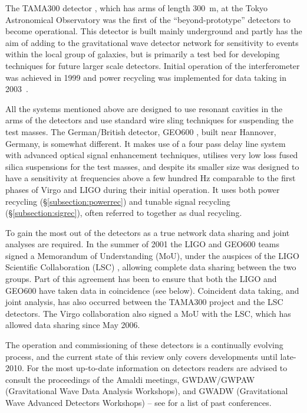 \documentclass{article}
\begin{document}
The TAMA300 detector \cite{TAMAweb}, which has arms of length 300~m, at the
Tokyo Astronomical Observatory was the first of the ``beyond-prototype''
detectors to become operational. This detector is built mainly underground and
partly has the aim of adding to the gravitational wave detector network for
sensitivity to events within the local group of galaxies, but is primarily a
test bed for developing techniques for future larger scale detectors. Initial
operation of the interferometer was achieved in 1999 and power recycling was
implemented for data taking in 2003~\cite{Arai:2003}.

All the systems mentioned above are designed to use resonant cavities in the
arms of the detectors and use standard wire sling techniques for suspending the
test masses. The German/British detector, GEO600 \cite{GEOweb}, built near
Hannover, Germany, is somewhat different. It makes use of a four pass delay line
system with advanced optical signal enhancement techniques, utilises very low
loss fused silica suspensions for the test masses, and despite its smaller size
was designed to have a sensitivity at frequencies above a few hundred Hz
comparable to the first phases of Virgo and LIGO during their initial operation.
It uses both power recycling (\S\ref{subsection:powerrec}) and tunable signal
recycling (\S\ref{subsection:sigrec}), often referred to together as dual
recycling.

To gain the most out of the detectors as a true network data sharing and joint
analyses are required. In the summer of 2001 the LIGO and GEO600 teams signed a
Memorandum of Understanding (MoU), under the auspices of the LIGO Scientific
Collaboration (LSC) \cite{LSCweb}, allowing complete data sharing between the
two groups. Part of this agreement has been to ensure that both the LIGO and
GEO600 have taken data in coincidence (see below). Coincident data taking, and
joint analysis, has also occurred between the TAMA300 project and the LSC
detectors. The Virgo collaboration also signed a MoU with the LSC, which has
allowed data sharing since May 2006.

The operation and commissioning of these detectors is a continually evolving
process, and the current state of this review only covers developments until
late-2010. For the most up-to-date information on detectors readers are advised
to consult the proceedings of the Amaldi meetings, GWDAW/GWPAW (Gravitational
Wave Data Analysis Workshops), and GWADW (Gravitational Wave Advanced Detectors
Workshops) -- see \cite{confs} for a list of past conferences.
\end{document}
